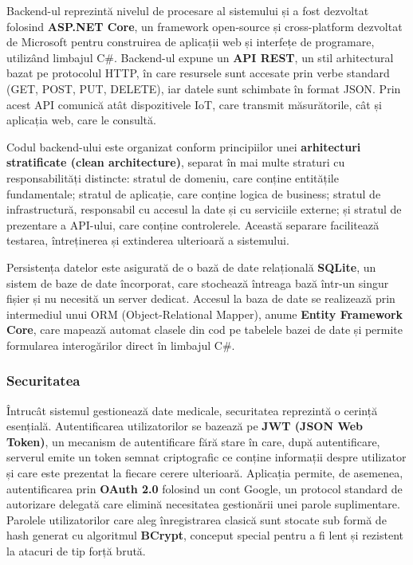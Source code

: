 ﻿\documentclass[12pt,a4paper,twoside]{article}
\begin{document}
Backend-ul reprezintă nivelul de procesare al sistemului și a fost dezvoltat folosind \textbf{ASP.NET Core}, un framework open-source și cross-platform dezvoltat de Microsoft pentru construirea de aplicații web și interfețe de programare, utilizând limbajul C\#. Backend-ul expune un \textbf{API REST}, un stil arhitectural bazat pe protocolul HTTP, în care resursele sunt accesate prin verbe standard (GET, POST, PUT, DELETE), iar datele sunt schimbate în format JSON. Prin acest API comunică atât dispozitivele IoT, care transmit măsurătorile, cât și aplicația web, care le consultă.

Codul backend-ului este organizat conform principiilor unei \textbf{arhitecturi stratificate (clean architecture)}, separat în mai multe straturi cu responsabilități distincte: stratul de domeniu, care conține entitățile fundamentale; stratul de aplicație, care conține logica de business; stratul de infrastructură, responsabil cu accesul la date și cu serviciile externe; și stratul de prezentare a API-ului, care conține controlerele. Această separare facilitează testarea, întreținerea și extinderea ulterioară a sistemului.

Persistența datelor este asigurată de o bază de date relațională \textbf{SQLite}, un sistem de baze de date încorporat, care stochează întreaga bază într-un singur fișier și nu necesită un server dedicat. Accesul la baza de date se realizează prin intermediul unui ORM (Object-Relational Mapper), anume \textbf{Entity Framework Core}, care mapează automat clasele din cod pe tabelele bazei de date și permite formularea interogărilor direct în limbajul C\#.

\subsubsection{Securitatea}

Întrucât sistemul gestionează date medicale, securitatea reprezintă o cerință esențială. Autentificarea utilizatorilor se bazează pe \textbf{JWT (JSON Web Token)}, un mecanism de autentificare fără stare în care, după autentificare, serverul emite un token semnat criptografic ce conține informații despre utilizator și care este prezentat la fiecare cerere ulterioară. Aplicația permite, de asemenea, autentificarea prin \textbf{OAuth 2.0} folosind un cont Google, un protocol standard de autorizare delegată care elimină necesitatea gestionării unei parole suplimentare. Parolele utilizatorilor care aleg înregistrarea clasică sunt stocate sub formă de hash generat cu algoritmul \textbf{BCrypt}, conceput special pentru a fi lent și rezistent la atacuri de tip forță brută.
\end{document}
